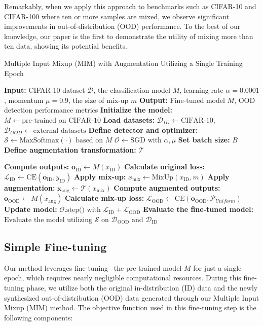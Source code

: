 \documentclass[letterpaper]{article} %
\begin{document}
Remarkably, when we apply this approach to benchmarks such as CIFAR-10 and CIFAR-100 where ten or more samples are mixed, we observe significant improvements in out-of-distribution (OOD) performance.
To the best of our knowledge, our paper is the first to demonstrate the utility of mixing more than ten data, showing its potential benefits.
\begin{algorithm}
\caption{Multiple Input Mixup (MIM) with Augmentation Utilizing a Single Training Epoch}
\begin{algorithmic}[1]
\State \textbf{Input:} CIFAR-10 dataset $\mathcal{D}$, the classification model $M$, learning rate $\alpha = 0.0001$, momentum $\mu = 0.9$, the size of mix-up $m$
\State \textbf{Output:} Fine-tuned model $M$, OOD detection performance metrics
\State \textbf{Initialize the model:} $M \gets \text{pre-trained on CIFAR-10}$
\State \textbf{Load datasets:}
\State \;\;\;$\mathcal{D}_{ID} \gets \text{CIFAR-10}$, $\mathcal{D}_{OOD} \gets \text{external datasets}$
\State \textbf{Define detector and optimizer:}
\State \;\;\;$\mathcal{S} \gets \text{MaxSoftmax}(\cdot) \text{ based on } M$
\State \;\;\;$\mathcal{O} \gets \text{SGD with } \alpha, \mu$
\State \textbf{Set batch size:} $B$
\State \textbf{Define augmentation transformation:} $\mathcal{T}$

    \State \textbf{Compute outputs:} $\mathbf{o}_{\text{ID}} \gets M(x_{\text{ID}})$
    \State \textbf{Calculate original loss:} $\mathcal{L}_{\text{ID}} \gets \text{CE}(\mathbf{o}_{\text{ID}}, y_{\text{ID}})$
    \State \textbf{Apply mix-up:} $x_{\text{mix}} \gets \text{MixUp}(x_{\text{ID}}, m)$
    \State \textbf{Apply augmentation:} $\mathbf{x}_{\text{aug}} \gets \mathcal{T}(x_{\text{mix}})$
    \State \textbf{Compute augmented outputs:} $\mathbf{o}_{\text{OOD}} \gets M(x_{\text{aug}})$
    \State \textbf{Calculate mix-up loss:}
    \State \;\;\;$\mathcal{L}_{\text{OOD}} \gets \text{CE}(\mathbf{o}_{\text{OOD}}, \mathcal{P}_{Uniform})$
    \State \textbf{Update model:} $\mathcal{O}.\text{step() with } \mathcal{L}_{\text{ID}} +\mathcal{L}_{\text{OOD}}$
\EndFor
\State \textbf{Evaluate the fine-tuned model:}
\State \;\;\;$\text{Evaluate the model utilizing $\mathcal{S}$ on } \mathcal{D}_{\text{OOD}} \text{ and } \mathcal{D}_{\text{ID}}$
\end{algorithmic}
\end{algorithm}

\subsection{Simple Fine-tuning}
Our method leverages fine-tuning~\cite{finetuning} the pre-trained model $M$ for just a single epoch, which requires nearly negligible computational resources.
During this fine-tuning phase, we utilize both the original in-distribution (ID) data and the newly synthesized out-of-distribution (OOD) data generated through our Multiple Input Mixup (MIM) method.
The objective function used in this fine-tuning step is the following components:
\end{document}
